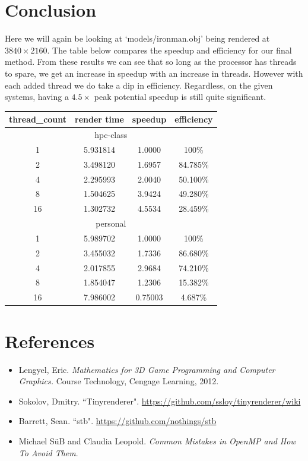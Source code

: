 \documentclass[12pt]{article}
\begin{document}
\clearpage
\section*{Conclusion}

Here we will again be looking at `models/ironman.obj' being rendered at $3840\times2160$. The
table below compares the speedup and efficiency for our final method. From these results
we can see that so long as the processor has threads to spare, we get an increase in
speedup with an increase in threads. However with each added thread we do take a dip in efficiency.
Regardless, on the given systems, having a $4.5\times$ peak potential speedup is still quite
significant.

\bigbreak
\begin{center}
	\begin{tabular}{|c|c|c|c|}
		\hline
		thread\_count & render time & speedup & efficiency \\ \hline \hline
		\multicolumn{4}{|c|}{hpc-class } \\ \hline
		1 & 5.931814 & 1.0000 & 100\% \\ \hline
		2 & 3.498120 & 1.6957 & 84.785\% \\ \hline
		4 & 2.295993 & 2.0040 & 50.100\% \\ \hline
		8 & 1.504625 & 3.9424 & 49.280\% \\ \hline
		16 & 1.302732 & 4.5534 & 28.459\% \\ \hline
		\multicolumn{4}{|c|}{personal } \\ \hline
		1 & 5.989702 & 1.0000 & 100\% \\ \hline
		2 & 3.455032 & 1.7336 & 86.680\% \\ \hline
		4 & 2.017855 & 2.9684 & 74.210\% \\ \hline
		8 & 1.854047 & 1.2306 & 15.382\% \\ \hline
		16 & 7.986002 & 0.75003 & 4.687\% \\ \hline
	\end{tabular}
\end{center}

\section*{References}

\begin{itemize}
	\item Lengyel, Eric. \textit{Mathematics for 3D Game Programming and Computer Graphics.} Course Technology,
Cengage Learning, 2012.
	\item Sokolov, Dmitry. ``Tinyrenderer". \url{https://github.com/ssloy/tinyrenderer/wiki}
	\item Barrett, Sean. ``stb". \url{https://github.com/nothings/stb}
	\item Michael S\"uB and Claudia Leopold. \textit{Common Mistakes in OpenMP and How To Avoid Them}.
\end{itemize}
\end{document}
